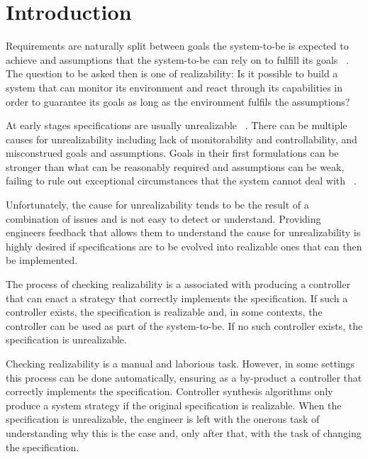 \section{Introduction}\label{sec:introduction}


Requirements are naturally split between goals the system-to-be is expected to achieve and
assumptions that the system-to-be can rely on to fulfill its goals ~\cite{Jackson:1995,Letier:2002}. The question to be asked then is one of realizability: Is it possible to build a system that can monitor its environment and react through its capabilities in order to guarantee its goals as long as the environment fulfils the assumptions?

At early stages specifications are usually unrealizable ~\cite{Letier:2002}. There can be 
multiple causes for unrealizability including lack of monitorability and controllability, 
and misconstrued goals and assumptions. Goals in their first formulations can  be 
stronger than what can be reasonably required and assumptions can be weak, failing to 
rule out exceptional circumstances that the system cannot deal with 
~\cite{vanLamsweerde:2000}. 

Unfortunately, the cause for unrealizability tends to be the result of a combination of issues and is not easy to detect or understand. Providing engineers feedback that allows them to understand the cause for unrealizability is highly desired if specifications are to be evolved into realizable ones that can then be implemented. 

The process of checking realizability is a associated with producing a controller that can 
enact a strategy that correctly implements the specification. If such a controller exists, 
the specification is realizable and, in some contexts, the controller can be used as part of 
the system-to-be. If no such controller exists, the specification is unrealizable. 

Checking realizability is a manual and laborious task. However, in some settings this 
process can be done automatically, ensuring as a by-product a controller  that correctly 
implements the specification.  Controller synthesis algorithms only produce a system 
strategy if the original specification is realizable. When the specification is unrealizable, 
the engineer is left with the onerous task of understanding why this is the case and, only 
after that, with the task of changing the specification.

